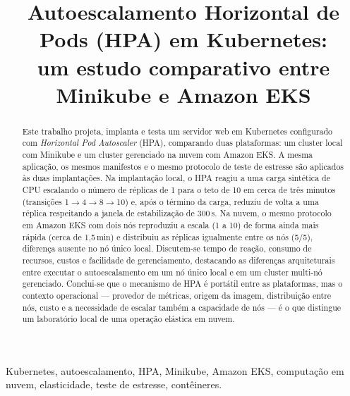 \documentclass[conference]{IEEEtran}
\begin{document}
\title{Autoescalamento Horizontal de Pods (HPA) em Kubernetes:\\
um estudo comparativo entre Minikube e Amazon EKS}

\author{
}

\maketitle

\begin{abstract}
Este trabalho projeta, implanta e testa um servidor web em Kubernetes configurado com
\textit{Horizontal Pod Autoscaler} (HPA), comparando duas plataformas: um cluster local com
Minikube e um cluster gerenciado na nuvem com Amazon EKS. A mesma aplicação, os mesmos
manifestos e o mesmo protocolo de teste de estresse são aplicados às duas implantações. Na
implantação local, o HPA reagiu a uma carga sintética de CPU escalando o número de réplicas de
1 para o teto de 10 em cerca de três minutos (transições 1$\to$4$\to$8$\to$10) e, após o
término da carga, reduziu de volta a uma réplica respeitando a janela de estabilização de
300\,s. Na nuvem, o mesmo protocolo em Amazon EKS com dois nós reproduziu a escala (1 a 10) de
forma ainda mais rápida (cerca de 1,5\,min) e distribuiu as réplicas igualmente entre os nós
(5/5), diferença ausente no nó único local. Discutem-se tempo de reação, consumo de recursos,
custos e facilidade de gerenciamento,
destacando as diferenças arquiteturais entre executar o autoescalamento em um nó único local e
em um cluster multi-nó gerenciado. Conclui-se que o mecanismo de HPA é portátil entre as
plataformas, mas o contexto operacional --- provedor de métricas, origem da imagem, distribuição
entre nós, custo e a necessidade de escalar também a capacidade de nós --- é o que distingue um
laboratório local de uma operação elástica em nuvem.
\end{abstract}

\begin{IEEEkeywords}
Kubernetes, autoescalamento, HPA, Minikube, Amazon EKS, computação em nuvem, elasticidade,
teste de estresse, contêineres.
\end{IEEEkeywords}
\end{document}
